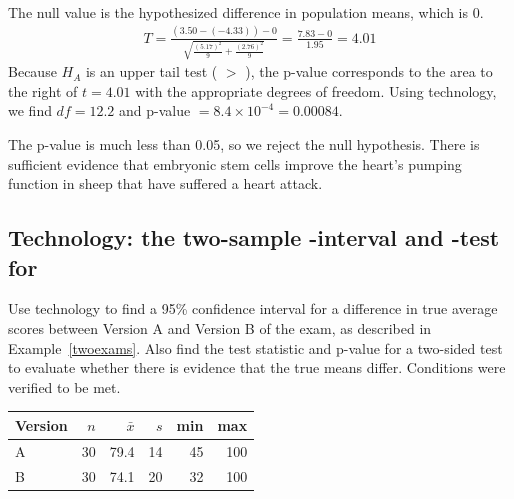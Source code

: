 \begin{examplewrap}
\begin{nexample}
\begin{description}
\\
The null value is the hypothesized difference in population means, which is 0.
\begin{align*}
T = \frac{(3.50 - (-4.33)) - 0}{\sqrt{\frac{(5.17)^2}{9} + \frac{(2.76)^2}{9}} } = \frac{7.83 - 0}{1.95} = 4.01 
\end{align*}
Because $H_A$ is an upper tail test ( $>$ ), the p-value corresponds to the area to the right of $t=4.01$ with the appropriate degrees of freedom.  Using technology, we find $df=12.2$ and p-value $ = 8.4\times 10^{-4}=0.00084$.  
\item[\inferencestep{Conclude}]  The p-value is much less than 0.05, so we reject the null hypothesis. There is sufficient evidence that embryonic stem cells improve the heart's pumping function in sheep that have suffered a heart attack.

\end{description}

\end{nexample}
\end{examplewrap}


\D{\newpage}


\subsection[Technology: the two-sample $t$-interval and $t$-test for $\mu_1 - \mu_2$]{Technology: the two-sample -interval and -test for }
\label{tech2T}

\noindent Use technology to find a 95\% confidence interval for a difference in true average scores between Version A and Version B of the exam, as described in Example~\ref{twoexams}.  Also find the test statistic and p-value for a two-sided test to evaluate whether there is evidence that the true means differ.  Conditions were verified to be met.
\begin{center}
\begin{tabular}{l rrrrr}
\hline
Version\hspace{2mm}	& $n$	& $\bar{x}$	& $s$	& min	& max  \\
\hline
A		& 30		& 79.4		& 14 	& 45		& 100 \\
B		& 30		& 74.1		& 20		& 32		& 100 \\
\hline
\end{tabular}
\end{center}


